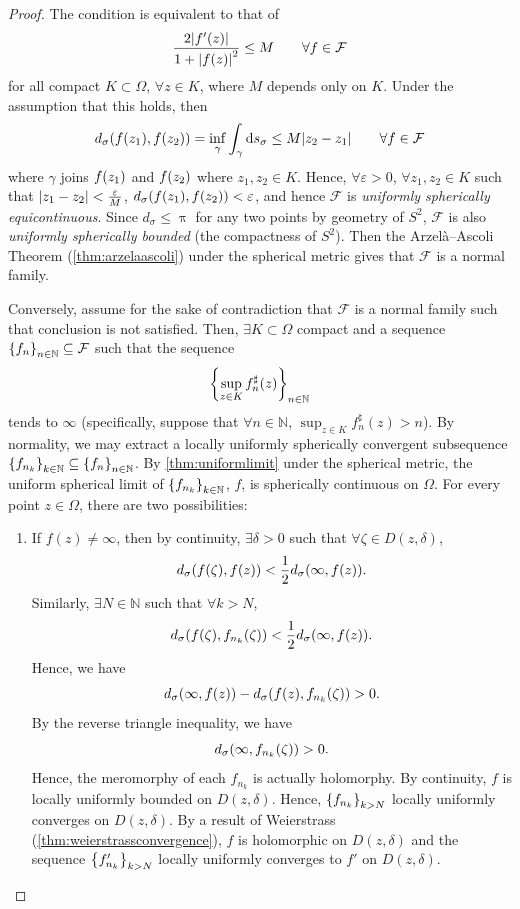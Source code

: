 \begin{proof}
    The condition is equivalent to that of \[\frac{2\abs{f'(z)}}{1+\abs{f(z)}^2}\leq M\qquad\forall f\in\mathcal{F}\] for all compact \(K\subset\Omega\), \(\forall z\in K\), where \(M\) depends only on \(K\). Under the assumption that this holds, then \[d_\sigma\qty(f\qty(z_1),f\qty(z_2))=\inf_\gamma\int_{\gamma}\dd{s}_{\sigma}\leq M\abs{z_2-z_1}\qquad\forall f\in\mathcal{F}\] where \(\gamma\) joins \(f\qty(z_1)\) and \(f\qty(z_2)\) where \(z_1,z_2\in K\). Hence, \(\forall\varepsilon>0\), \(\forall z_1,z_2\in K\) such that \(\abs{z_1-z_2}<\frac{\varepsilon}{M}\), \(d_\sigma\qty(f\qty(z_1),f\qty(z_2))<\varepsilon\), and hence \(\mathcal{F}\) is \textit{uniformly spherically equicontinuous}. Since \(d_\sigma\leq\uppi\) for any two points by geometry of \(S^2\), \(\mathcal{F}\) is also \emph{uniformly spherically bounded} (the compactness of \(S^2\)). Then the Arzelà--Ascoli Theorem (\cref{thm:arzelaascoli}) under the spherical metric gives that \(\mathcal{F}\) is a normal family.

    Conversely, assume for the sake of contradiction that \(\mathcal{F}\) is a normal family such that conclusion is not satisfied. Then, \(\exists K\subset\Omega\) compact and a sequence \(\cbraces{f_n}_{n\in\mathbb{N}}\subseteq\mathcal{F}\) such that the sequence \[\cbraces{\sup_{z\in K}f^\sharp_n(z)}_{n\in\mathbb{N}}\] tends to \(\infty\) (specifically, suppose that \(\forall n\in\mathbb{N}\), \(\sup_{z\in K}f_n^\sharp(z)>n\)). By normality, we may extract a locally uniformly spherically convergent subsequence \(\cbraces{f_{n_k}}_{k\in\mathbb{N}}\subseteq\cbraces{f_n}_{n\in\mathbb{N}}\). By \cref{thm:uniformlimit} under the spherical metric, the uniform spherical limit of \(\cbraces{f_{n_k}}_{k\in\mathbb{N}}\), \(f\), is spherically continuous on \(\Omega\). For every point \(z\in\Omega\), there are two possibilities:
    \begin{enumerate}
        \item If \(f(z)\neq\infty\), then by continuity, \(\exists\delta>0\) such that \(\forall\zeta\in D(z,\delta)\), \[d_\sigma\qty(f(\zeta),f(z))<\frac12d_\sigma\qty(\infty, f(z)).\] Similarly, \(\exists N\in\mathbb{N}\) such that \(\forall k>N\), \[d_\sigma\qty(f(\zeta),f_{n_k}(\zeta))<\frac12d_\sigma\qty(\infty, f(z)).\]
            Hence, we have \[d_\sigma\qty(\infty,f(z))-d_\sigma\qty(f(z),f_{n_k}(\zeta))>0.\] By the reverse triangle inequality, we have \[d_\sigma\qty(\infty,f_{n_k}(\zeta))>0.\]
            Hence, the meromorphy of each \(f_{n_k}\) is actually holomorphy. By continuity, \(f\) is locally uniformly bounded on \(D(z,\delta)\). Hence, \(\cbraces{f_{n_k}}_{k>N}\) locally uniformly converges on \(D(z,\delta)\). By a result of Weierstrass (\cref{thm:weierstrassconvergence}), \(f\) is holomorphic on \(D(z,\delta)\) and the sequence \(\cbraces{f'_{n_k}}_{k>N}\) locally uniformly converges to \(f'\) on \(D(z,\delta)\).


\end{enumerate}
\end{proof}
